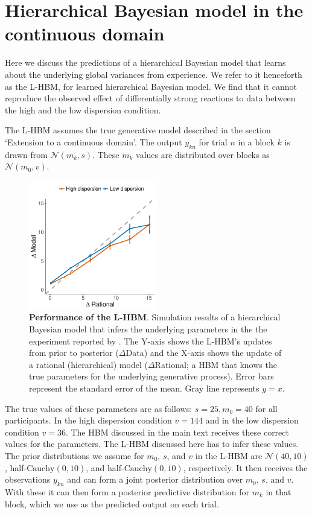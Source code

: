 

\section{Hierarchical Bayesian model in the continuous domain}
\label{app:LTI_HBM}

Here we discuss the predictions of a hierarchical Bayesian model that learns about the underlying global variances from experience. We refer to it henceforth as the L-HBM, for learned hierarchical Bayesian model. We find that it cannot reproduce the observed effect of differentially strong reactions to data between the high and the low dispersion condition. 

The L-HBM assumes the true generative model described in the section `Extension to a continuous domain'. The output $y_{kn}$ for trial $n$ in a block $k$ is drawn from $\mathcal{N}(m_k,s)$. These $m_k$ values are distributed over blocks as $\mathcal{N}(m_0,v)$.


\begin{figure}[hb!]
\centering
    \includegraphics[width=0.5\textwidth]{figures/samstan.pdf}
  \caption{\textbf{Performance of the L-HBM}. Simulation results of a hierarchical Bayesian model that infers the underlying parameters in the the experiment reported by \citet{gershman2017blessing}. The Y-axis shows the L-HBM's updates from prior to posterior ($\Delta$Data) and the X-axis shows the update of a rational (hierarchical) model ($\Delta$Rational; a HBM that knows the true parameters for the underlying generative process). Error bars represent the standard error of the mean. Gray line represents $y=x$.} 
  \label{fig:App:hierBayes}
\end{figure}

The true values of these parameters are as follows: $s = 25, m_0 = 40$ for all participants. In the high dispersion condition $v = 144$ and in the low dispersion condition $v = 36$.  The HBM discussed in the main text receives these correct values for the parameters. The L-HBM discussed here has to infer these values. The prior distributions we assume for $m_0$, $s$, and $v$ in the L-HBM are $\mathcal{N}(40,10)$, half-$\mathrm{Cauchy}(0,10)$, and half-$\mathrm{Cauchy}(0,10)$, respectively. It then receives the observations $y_{kn}$ and can form a joint posterior distribution over $m_0$, $s$, and $v$. With these it can then form a posterior predictive distribution for $m_k$ in that block, which we use as the predicted output on each trial.

